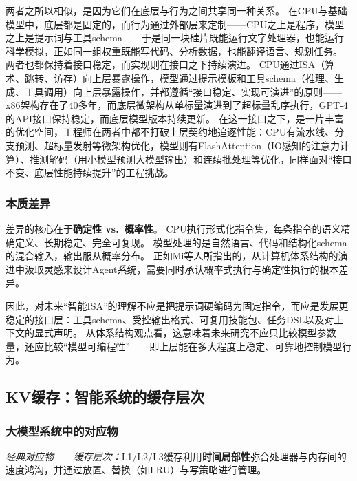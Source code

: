 两者之所以相似，是因为它们在底层与行为之间共享同一种关系。
在CPU与基础模型中，底层都是固定的，而行为通过外部层来定制——CPU之上是程序，模型之上是提示词与工具schema——于是同一块硅片既能运行文字处理器，也能运行科学模拟，正如同一组权重既能写代码、分析数据，也能翻译语言、规划任务。
两者也都保持着接口稳定，而实现则在接口之下持续演进。
CPU通过ISA（算术、跳转、访存）向上层暴露操作，模型通过提示模板和工具schema（推理、生成、工具调用）向上层暴露操作，并都遵循``接口稳定、实现可演进''的原则——x86架构存在了40多年，而底层微架构从单标量演进到了超标量乱序执行，GPT-4的API接口保持稳定，而底层模型版本持续更新。
在这一接口之下，是一片丰富的优化空间，工程师在两者中都不打破上层契约地追逐性能：CPU有流水线、分支预测、超标量发射等微架构优化，模型则有FlashAttention（IO感知的注意力计算\cite{dao2022flashattention}）、推测解码（用小模型预测大模型输出\cite{leviathan2023speculative}）和连续批处理等优化，同样面对``接口不变、底层性能持续提升''的工程挑战。

\subsubsection{本质差异}

差异的核心在于\textbf{确定性 vs.\ 概率性}。
CPU执行形式化指令集，每条指令的语义精确定义、长期稳定、完全可复现。
模型处理的是自然语言、代码和结构化schema的混合输入，输出服从概率分布。
正如Mi等人所指出的，从计算机体系结构的演进中汲取灵感来设计Agent系统，需要同时承认概率式执行与确定性执行的根本差异\cite{mi2025llmagentscomputersystems}。

因此，对未来``智能ISA''的理解不应是把提示词硬编码为固定指令，而应是发展更稳定的接口层：工具schema、受控输出格式、可复用技能包、任务DSL以及对上下文的显式声明。
从体系结构观点看，这意味着未来研究不应只比较模型参数量，还应比较``模型可编程性''——即上层能在多大程度上稳定、可靠地控制模型行为。

\subsection{KV缓存：智能系统的缓存层次}
\label{sec:kv}

\subsubsection{大模型系统中的对应物}

\textit{经典对应物——缓存层次：}L1/L2/L3缓存利用\textbf{时间局部性}弥合处理器与内存间的速度鸿沟，并通过放置、替换（如LRU）与写策略进行管理\cite{drepper2007memory}。

